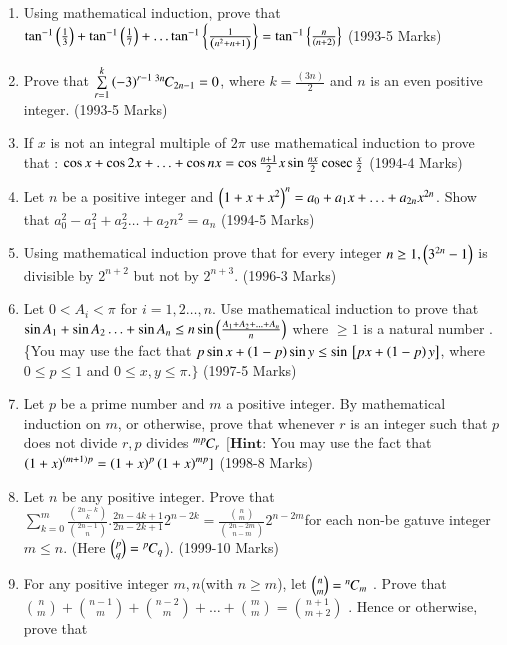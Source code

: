 \documentclass[journal]{IEEEtran}
\begin{document}
\begin{enumerate}[start=16] 
\item Using mathematical induction, prove that $\tan^{-1}\left(\frac{1}{3}\right)  +  \tan^{-1}\left(\frac{1}{7}\right) + \ldots \tan^{-1}\left\{\frac{1}{\left(n^2 + n + 1\right)}\right\} = \tan^{-1}\left\{\frac{n}{\left(n+2\right)}\right\}$
\hfill(1993-5 Marks) 
\item Prove that $\sum\limits^{k}_{r=1} \left(-3\right)^{r-1} {{}^{3n}\mkern-1muC_{2n-1}} = 0$, where $k=\frac{(3n)}{2}$ and $n$ is an even positive integer.
\hfill(1993-5 Marks)
\item If $x$ is not an integral multiple of $2\pi$ use mathematical induction to prove that : 
$\cos{x} + \cos{2x} + \ldots + \cos{nx} = \cos{\frac{n+1}{2}x}\sin{\frac{nx}{2}}\,\text{cosec}\,{\frac{x}{2}}$
\hfill(1994-4 Marks)
\item 
Let $n$ be a positive integer and $\left(1+x+x^2\right)^n = a_0 + a_1 x + \ldots + a_{2n} x^{2n}$. Show that $a_0^2 - a_1^2 + a_2^2 \ldots + a_2n^2 = a_n$
\hfill(1994-5 Marks)
\item 
Using mathematical induction prove that for every integer $n \geq 1 , \left(3^{2n} -1\right)$ is divisible by $2^{n+2}$ but not by $2^{n+3}$.
\hfill(1996-3 Marks)
\item 
Let $0<A_i<\pi$ for $i= 1,2\ldots,n$. Use mathematical induction to prove that $\sin{A_1} + \sin{A_2}\ldots + \sin{A_n} \leq  n \sin{\ensuremath{\left(\frac{A_1 + A_2 +\ldots+ A_n}{n}\right)}}$ where $\geq 1$ is a natural number .\{You may use the fact that $p \sin{x} + \left(1-p\right)\sin{y}\leq \sin{\ensuremath{{}\left[px + \left(1-p\right)y\right]}}$, where $0 \leq p \leq 1$ and $0 \leq x,y \leq \pi.\}$
\hfill(1997-5 Marks)
\item 
Let $p$ be a prime number and $m$ a positive integer. By mathematical induction on $m$, or otherwise, prove that whenever $r$ is an integer such that $p$ does not divide $r , p$ divides ${{}^{mp}\mkern-1muC_{r}}$
$[\textbf{Hint:}$ You may use the fact that $\left(1+x\right)^{\left(m+1\right)p} = \left(1+x\right)^p\left(1+x\right)^{mp}]$
\hfill(1998-8 Marks)
\item 
Let $n$ be any positive integer. Prove that $\sum\limits^{m}_{k=0}\frac{\binom{2n-k}{k}}{\binom{2n-1}{n}}.\frac{2n-4k+1}{2n-2k+1}2^{n-2k}= \frac{\binom{n}{m}}{\binom{2n-2m}{n-m}} 2^{n-2m}$for each non-be gatuve integer $m\leq n$. (Here $\binom{p}{q} = {{}^{p}\mkern-1muC_{q}}$).
\hfill(1999-10 Marks)
\item
For any positive integer $m,n$(with $n \geq m$), let $\binom{n}{m} ={{}^{n}\mkern-1muC_{m}}$ . Prove that $\binom{n}{m} + \binom{n-1}{m} + \binom{n-2}{m} + \ldots + \binom{m}{m} = \binom{n+1}{m+2}$ . Hence or otherwise, prove that 

\end{enumerate}
\end{document}
